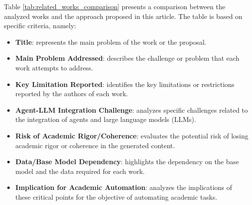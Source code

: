 \par\par
Table \ref{tab:related_works_comparison} presents a comparison between the analyzed works and the approach proposed in this article. The table is based on specific criteria, namely:
\begin{itemize}
    \item \textbf{Title}: represents the main problem of the work or the proposal.
    \item \textbf{Main Problem Addressed}: describes the challenge or problem that each work attempts to address.
    \item \textbf{Key Limitation Reported}: identifies the key limitations or restrictions reported by the authors of each work.
    \item \textbf{Agent-LLM Integration Challenge}: analyzes specific challenges related to the integration of agents and large language models (LLMs).
    \item \textbf{Risk of Academic Rigor/Coherence}: evaluates the potential risk of losing academic rigor or coherence in the generated content.
    \item \textbf{Data/Base Model Dependency}: highlights the dependency on the base model and the data required for each work.
    \item \textbf{Implication for Academic Automation}: analyzes the implications of these critical points for the objective of automating academic tasks.
\end{itemize}

